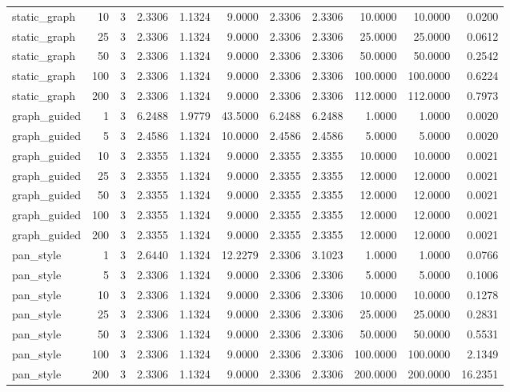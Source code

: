 \begin{table}[t]
\begin{tabular}{lrrrrrrrrrr}
static\_graph & 10 & 3 & 2.3306 & 1.1324 & 9.0000 & 2.3306 & 2.3306 & 10.0000 & 10.0000 & 0.0200 \\
static\_graph & 25 & 3 & 2.3306 & 1.1324 & 9.0000 & 2.3306 & 2.3306 & 25.0000 & 25.0000 & 0.0612 \\
static\_graph & 50 & 3 & 2.3306 & 1.1324 & 9.0000 & 2.3306 & 2.3306 & 50.0000 & 50.0000 & 0.2542 \\
static\_graph & 100 & 3 & 2.3306 & 1.1324 & 9.0000 & 2.3306 & 2.3306 & 100.0000 & 100.0000 & 0.6224 \\
static\_graph & 200 & 3 & 2.3306 & 1.1324 & 9.0000 & 2.3306 & 2.3306 & 112.0000 & 112.0000 & 0.7973 \\
graph\_guided & 1 & 3 & 6.2488 & 1.9779 & 43.5000 & 6.2488 & 6.2488 & 1.0000 & 1.0000 & 0.0020 \\
graph\_guided & 5 & 3 & 2.4586 & 1.1324 & 10.0000 & 2.4586 & 2.4586 & 5.0000 & 5.0000 & 0.0020 \\
graph\_guided & 10 & 3 & 2.3355 & 1.1324 & 9.0000 & 2.3355 & 2.3355 & 10.0000 & 10.0000 & 0.0021 \\
graph\_guided & 25 & 3 & 2.3355 & 1.1324 & 9.0000 & 2.3355 & 2.3355 & 12.0000 & 12.0000 & 0.0021 \\
graph\_guided & 50 & 3 & 2.3355 & 1.1324 & 9.0000 & 2.3355 & 2.3355 & 12.0000 & 12.0000 & 0.0021 \\
graph\_guided & 100 & 3 & 2.3355 & 1.1324 & 9.0000 & 2.3355 & 2.3355 & 12.0000 & 12.0000 & 0.0021 \\
graph\_guided & 200 & 3 & 2.3355 & 1.1324 & 9.0000 & 2.3355 & 2.3355 & 12.0000 & 12.0000 & 0.0021 \\
pan\_style & 1 & 3 & 2.6440 & 1.1324 & 12.2279 & 2.3306 & 3.1023 & 1.0000 & 1.0000 & 0.0766 \\
pan\_style & 5 & 3 & 2.3306 & 1.1324 & 9.0000 & 2.3306 & 2.3306 & 5.0000 & 5.0000 & 0.1006 \\
pan\_style & 10 & 3 & 2.3306 & 1.1324 & 9.0000 & 2.3306 & 2.3306 & 10.0000 & 10.0000 & 0.1278 \\
pan\_style & 25 & 3 & 2.3306 & 1.1324 & 9.0000 & 2.3306 & 2.3306 & 25.0000 & 25.0000 & 0.2831 \\
pan\_style & 50 & 3 & 2.3306 & 1.1324 & 9.0000 & 2.3306 & 2.3306 & 50.0000 & 50.0000 & 0.5531 \\
pan\_style & 100 & 3 & 2.3306 & 1.1324 & 9.0000 & 2.3306 & 2.3306 & 100.0000 & 100.0000 & 2.1349 \\
pan\_style & 200 & 3 & 2.3306 & 1.1324 & 9.0000 & 2.3306 & 2.3306 & 200.0000 & 200.0000 & 16.2351 \\

\end{tabular}
\end{table}
